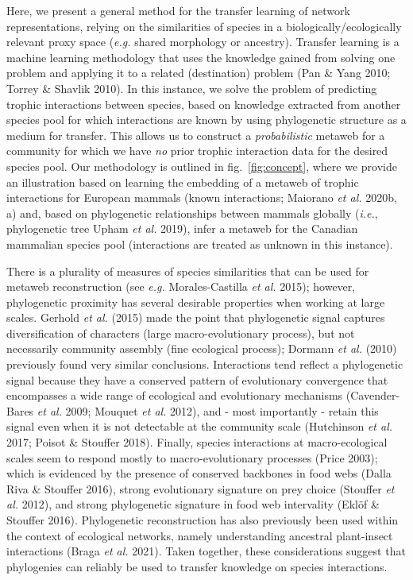 \documentclass[11pt]{article}
\begin{document}
Here, we present a general method for the transfer learning of network
representations, relying on the similarities of species in a
biologically/ecologically relevant proxy space (\emph{e.g.} shared
morphology or ancestry). Transfer learning is a machine learning
methodology that uses the knowledge gained from solving one problem and
applying it to a related (destination) problem (Pan \& Yang 2010; Torrey
\& Shavlik 2010). In this instance, we solve the problem of predicting
trophic interactions between species, based on knowledge extracted from
another species pool for which interactions are known by using
phylogenetic structure as a medium for transfer. This allows us to
construct a \emph{probabilistic} metaweb for a community for which we
have \emph{no} prior trophic interaction data for the desired species
pool. Our methodology is outlined in fig.~\ref{fig:concept}, where we
provide an illustration based on learning the embedding of a metaweb of
trophic interactions for European mammals (known interactions; Maiorano
\emph{et al.} 2020b, a) and, based on phylogenetic relationships between
mammals globally (\emph{i.e.}, phylogenetic tree Upham \emph{et al.}
2019), infer a metaweb for the Canadian mammalian species pool
(interactions are treated as unknown in this instance).

There is a plurality of measures of species similarities that can be
used for metaweb reconstruction (see \emph{e.g.} Morales-Castilla
\emph{et al.} 2015); however, phylogenetic proximity has several
desirable properties when working at large scales. Gerhold \emph{et al.}
(2015) made the point that phylogenetic signal captures diversification
of characters (large macro-evolutionary process), but not necessarily
community assembly (fine ecological process); Dormann \emph{et al.}
(2010) previously found very similar conclusions. Interactions tend
reflect a phylogenetic signal because they have a conserved pattern of
evolutionary convergence that encompasses a wide range of ecological and
evolutionary mechanisms (Cavender-Bares \emph{et al.} 2009; Mouquet
\emph{et al.} 2012), and - most importantly - retain this signal even
when it is not detectable at the community scale (Hutchinson \emph{et
al.} 2017; Poisot \& Stouffer 2018). Finally, species interactions at
macro-ecological scales seem to respond mostly to macro-evolutionary
processes (Price 2003); which is evidenced by the presence of conserved
backbones in food webs (Dalla Riva \& Stouffer 2016), strong
evolutionary signature on prey choice (Stouffer \emph{et al.} 2012), and
strong phylogenetic signature in food web intervality (Eklöf \& Stouffer
2016). Phylogenetic reconstruction has also previously been used within
the context of ecological networks, namely understanding ancestral
plant-insect interactions (Braga \emph{et al.} 2021). Taken together,
these considerations suggest that phylogenies can reliably be used to
transfer knowledge on species interactions.
\end{document}
